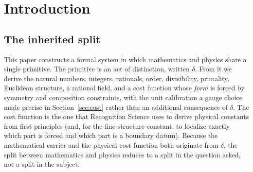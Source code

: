 \documentclass[11pt,a4paper]{article}
\theoremstyle{definition}
\theoremstyle{remark}
\begin{document}
\begin{abstract}
Three companion papers supply the continuous carrier and geometric realization.
The functional-equation paper proves the canonical reciprocal cost on positive
ratios~\cite{Washburn2026LogicFE}. The arithmetic paper recovers number from
the Law of Logic on the continuous carrier~\cite{Washburn2026Arithmetic}. The
recognition-geometry paper connects event quotients to
comparison~\cite{Washburn2026Geometry}. The present paper sits below those
results by constructing the carrier surface from distinction itself. The
current formal state proves a conditional universal-foundation certificate:
kernel, logic, arithmetic, rational field, real-completion surface,
formal-system embedding, admissible-foundation inevitability, recognizer cost
bridge, and the resolved cost-joint stratification all compose. The cost-forcing
question is settled (as a negative): $\delta$ forces the cost form and a unit
calibration fixes the gauge that selects $J$. The only remaining open item before
an unqualified theorem is parsing historical external foundations into the
formal-system interface.
\end{abstract}

\tableofcontents

\section{Introduction}\label{sec:intro}

\subsection{The inherited split}

This paper constructs a formal system in which mathematics and physics share
a single primitive. The primitive is an act of distinction, written $\delta$.
From it we derive the natural numbers, integers, rationals, order,
divisibility, primality, Euclidean structure, a rational field, and a cost
function whose \emph{form} is forced by symmetry and composition constraints,
with the unit calibration a gauge choice made precise in
Section~\ref{sec:cost} rather than an additional consequence of $\delta$. The
cost function is the one that Recognition Science uses to derive physical
constants from first principles (and, for the fine-structure constant, to
localize exactly which part is forced and which part is a boundary datum). Because the mathematical carrier and the physical cost function
both originate from $\delta$, the split between mathematics and physics
reduces to a split in the question asked, not a split in the subject.
\end{document}
